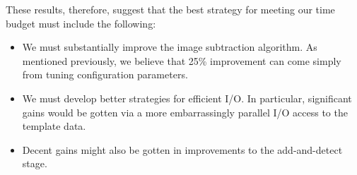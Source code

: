 These results, therefore, suggest that the best strategy for meeting
our time budget must include the following:

\begin{itemize}
\item We must substantially improve the image subtraction algorithm.
  As mentioned previously, we believe that 25\% improvement can come
  simply from tuning configuration parameters.  
\item We must develop better strategies for efficient I/O.  In
  particular, significant gains would be gotten via a more
  embarrassingly parallel I/O access to the template data.
\item Decent gains might also be gotten in improvements to the
  add-and-detect stage.  
\end{itemize}

